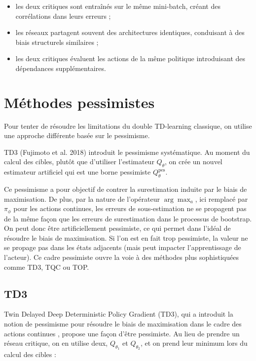 \documentclass[a4paper, 12pt]{report}
\begin{document}
    \begin{itemize}
      \item les deux critiques sont entraînés sur le même mini-batch, créant des corrélations dans leurs erreurs ;
      \item les réseaux partagent souvent des architectures identiques, conduisant à des biais structurels similaires ;
      \item les deux critiques évaluent les actions de la même politique introduisant des dépendances supplémentaires.
    \end{itemize}

    \section{Méthodes pessimistes}

    Pour tenter de résoudre les limitations du double TD-learning classique, on
    utilise une approche différente basée sur le pessimisme.

    TD3 (Fujimoto et al. 2018) introduit le pessimisme systématique. Au moment
    du calcul des cibles, plutôt que d'utiliser l'estimateur $Q_\theta$, on
    crée un nouvel estimateur artificiel qui est une borne pessimiste
    $Q^\text{pes}_\theta$.

    Ce pessimisme a pour objectif de contrer la surestimation induite par le
    biais de maximisation. De plus, par la nature de l'opérateur $\arg\max_a$,
    ici remplacé par $\pi_\phi$ pour les actions continues, les erreurs de
    sous-estimation ne se propagent pas de la même façon que les erreurs de
    surestimation dans le processus de bootstrap. On peut donc être
    artificiellement pessimiste, ce qui permet dans l'idéal de résoudre le
    biais de maximisation. Si l'on est en fait trop pessimiste, la valeur
    ne se propage pas dans les états adjacents (mais peut impacter
    l'apprentissage de l'acteur). Ce cadre pessimiste ouvre la voie à des
    méthodes plus sophistiquées comme TD3, TQC ou TOP.

    \subsection{TD3}

    Twin Delayed Deep Deterministic Policy Gradient (TD3), qui a introduit la
    notion de pessimisme pour résoudre le biais de maximisation dans le cadre
    des actions continues
    \cite{fujimoto2018addressingfunctionapproximationerror}, propose une façon
    d'être pessimiste. Au lieu de prendre un réseau critique, on en utilise
    deux, $Q_{\theta_1}$ et $Q_{\theta_2}$, et on prend leur minimum lors du
    calcul des cibles :
\end{document}
